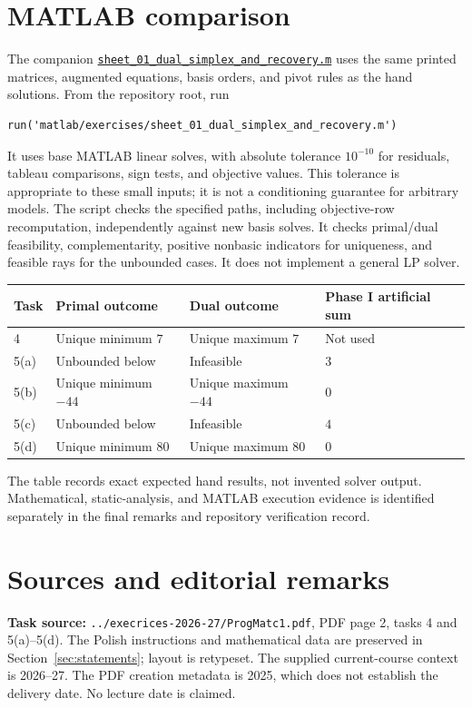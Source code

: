 \documentclass[11pt,a4paper]{article}
\begin{document}
\section{MATLAB comparison}\label{sec:matlab}
The companion
\href{run:matlab/exercises/sheet_01_dual_simplex_and_recovery.m}{\texttt{sheet\_01\_dual\_simplex\_and\_recovery.m}}
uses the same printed matrices, augmented equations, basis orders, and pivot
rules as the hand solutions. From the repository root, run
\begin{lstlisting}
run('matlab/exercises/sheet_01_dual_simplex_and_recovery.m')
\end{lstlisting}
It uses base MATLAB linear solves, with absolute tolerance $10^{-10}$ for
residuals, tableau comparisons, sign tests, and objective values. This tolerance
is appropriate to these small inputs; it is not a conditioning guarantee for
arbitrary models. The script checks the specified paths, including objective-row
recomputation, independently against new basis solves. It checks primal/dual
feasibility, complementarity, positive nonbasic indicators for uniqueness, and
feasible rays for the unbounded cases. It does not implement a general LP solver.

\begin{center}
  \begin{tabular}{llll}\toprule
    Task & Primal outcome & Dual outcome & Phase I artificial sum\\\midrule
    4 & Unique minimum $7$ & Unique maximum $7$ & Not used\\
    5(a) & Unbounded below & Infeasible & $3$\\
    5(b) & Unique minimum $-44$ & Unique maximum $-44$ & $0$\\
    5(c) & Unbounded below & Infeasible & $4$\\
    5(d) & Unique minimum $80$ & Unique maximum $80$ & $0$\\\bottomrule
  \end{tabular}
\end{center}
The table records exact expected hand results, not invented solver output.
Mathematical, static-analysis, and MATLAB execution evidence is identified
separately in the final remarks and repository verification record.

\section{Sources and editorial remarks}\label{sec:sources}
\noindent\textbf{Task source:} \texttt{../execrices-2026-27/ProgMatc1.pdf},
PDF page 2, tasks 4 and 5(a)--5(d). The Polish instructions and mathematical data
are preserved in Section~\ref{sec:statements}; layout is retypeset.
The supplied current-course context is 2026--27. The PDF creation metadata is
2025, which does not establish the delivery date. No lecture date is claimed.
\end{document}
